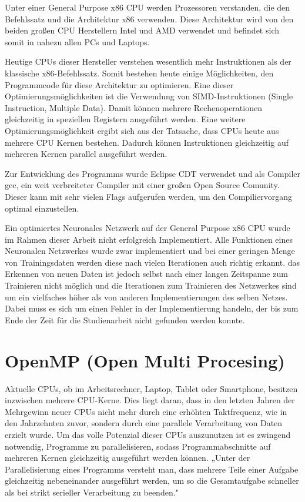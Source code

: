 \documentclass[../main.tex]{subfiles}
\begin{document}
Unter einer General Purpose x86 CPU werden Prozessoren verstanden, die den Befehlssatz und die Architektur x86 verwenden. Diese Architektur wird von den beiden großen CPU Herstellern Intel und AMD verwendet und befindet sich somit in nahezu allen PCs und Laptops. 

Heutige CPUs dieser Hersteller verstehen wesentlich mehr Instruktionen als der klassische x86-Befehlssatz. Somit bestehen heute einige Möglichkeiten, den Programmcode für diese Architektur zu optimieren. Eine dieser Optimierungsmöglichkeiten ist die Verwendung von SIMD-Instruktionen (Single Instruction, Multiple Data). Damit können mehrere Rechenoperationen gleichzeitig in speziellen Registern ausgeführt werden.
Eine weitere Optimierungsmöglichkeit ergibt sich aus der Tatsache,  dass CPUs heute aus mehrere CPU Kernen bestehen. Dadurch können Instruktionen gleichzeitig auf mehreren Kernen parallel ausgeführt werden.

Zur Entwicklung des Programms wurde Eclipse CDT verwendet und als Compiler gcc, ein weit verbreiteter Compiler mit einer großen Open Source Comunity. Dieser kann mit sehr vielen Flags aufgerufen werden, um den Compiliervorgang optimal einzustellen.

Ein optimiertes Neuronales Netzwerk auf der General Purpose x86 CPU wurde im Rahmen dieser Arbeit nicht erfolgreich Implementiert. Alle Funktionen eines Neuronalen Netzwerkes wurde zwar implementiert und bei einer geringen Menge von Trainingsdaten werden diese nach vielen Iterationen auch richtig erkannt. das Erkennen von neuen Daten ist jedoch selbst nach einer langen Zeitspanne zum Trainieren nicht möglich und die Iterationen zum Trainieren des Netzwerkes sind um ein vielfaches höher als von anderen Implementierungen des selben Netzes. Dabei muss es sich um einen Fehler in der Implementierung handeln, der bis zum Ende der Zeit für die Studienarbeit nicht gefunden werden konnte. 

\section{OpenMP (Open Multi Procesing)}

Aktuelle CPUs, ob im Arbeitsrechner, Laptop, Tablet oder Smartphone, besitzen inzwischen mehrere CPU-Kerne. Dies liegt daran, dass in den letzten Jahren der Mehrgewinn neuer CPUs nicht mehr durch eine erhöhten Taktfrequenz, wie in den Jahrzehnten zuvor, sondern durch eine parallele Verarbeitung von Daten erzielt wurde. Um das volle Potenzial dieser CPUs auszunutzen ist es zwingend notwendig, Programme zu parallelisieren, sodass Programmabschnitte auf mehreren Kernen gleichzeitig ausgeführt werden können.
„Unter der Parallelisierung eines Programms versteht man, dass mehrere Teile einer Aufgabe gleichzeitig nebeneinander ausgeführt werden, um so die Gesamtaufgabe schneller als bei strikt serieller Verarbeitung zu beenden." \cite{articleOpenMP}
\end{document}
